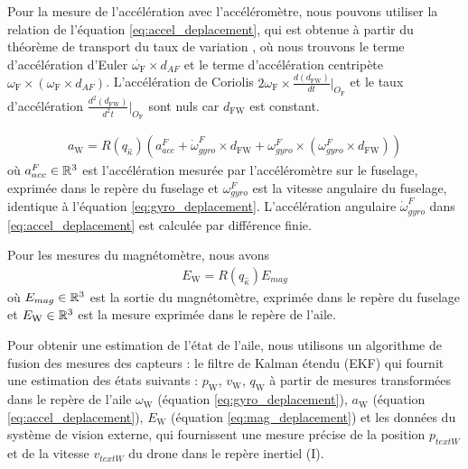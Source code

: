 Pour la mesure de l'accélération avec l'accéléromètre, nous pouvons utiliser la relation de l'équation \eqref{eq:accel_deplacement}, qui est obtenue à partir du théorème de transport du taux de variation \cite{brizard2004motion}, où nous trouvons le terme d'accélération d'Euler $\dot{\omega_{\text{F}}} \times d_{AF}$  et le terme d'accélération centripète $\omega_{\text{F}} \times ( \omega_{\text{F}} \times  d_{AF})$. L'accélération de Coriolis $2\omega_{\text{F}} \times \frac{d (d_{\text{FW}})}{d t}\Bigr|_{O_{\text{F}}}$ et le taux d'accélération $\frac{d^{2} (d_{\text{FW}})}{d^{2} t}\Bigr|_{O_{\text{F}}}$ sont nuls car $d_{\text{FW}}$ est constant.

\begin{align}
    \label{eq:accel_deplacement}
    a_{\text{W}} = R(q_{\hat{\kappa}}) \left( a_{acc}^{F} + \dot{\omega}_{gyro}^{F} \times d_{\text{FW}} + \omega_{gyro}^{F} \times ( \omega_{gyro}^{F} \times  d_{\text{FW}}) \right) 
\end{align}
où $a_{acc}^{F} \in {\mathbb R}^{3}$ est l'accélération mesurée par l'accéléromètre sur le fuselage, exprimée dans le repère du fuselage et $\omega_{gyro}^{F}$ est la vitesse angulaire du fuselage, identique à l'équation \eqref{eq:gyro_deplacement}. L'accélération angulaire $\dot{\omega}_{gyro}^{F}$ dans \eqref{eq:accel_deplacement} est calculée par différence finie.


Pour les mesures du magnétomètre, nous avons
\begin{align}
    \label{eq:mag_deplacement}
    E_{\text{W}} = R(q_{\hat{\kappa}}) E_{mag}
\end{align}
où $E_{mag} \in {\mathbb R}^{3}$ est la sortie du magnétomètre, exprimée dans le repère du fuselage et $ E_{\text{W}} \in {\mathbb R}^{3}$ est la mesure exprimée dans le repère de l'aile.

Pour obtenir une estimation de l'état de l'aile, nous utilisons un algorithme de fusion des mesures des capteurs : le filtre de Kalman étendu (EKF)   qui fournit une estimation des états suivants : $p_{\text{W}}$, $v_{\text{W}}$, $q_{\text{W}}$ à partir de mesures transformées dans le repère de l'aile $\omega_{\text{W}}$ (équation \eqref{eq:gyro_deplacement}), $a_{\text{W}}$ (équation \eqref{eq:accel_deplacement}), $E_{\text{W}}$ (équation \eqref{eq:mag_deplacement}) et les données du système de vision externe, qui fournissent une mesure précise de la position $p_{text{W}}$ et de la vitesse $v_{text{W}}$ du drone dans le repère inertiel (I).


